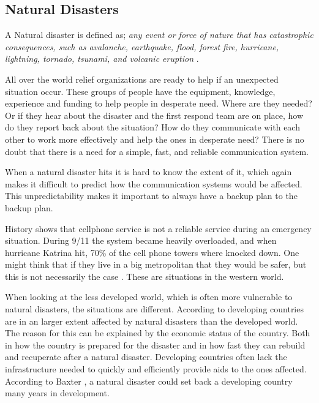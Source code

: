 \subsection{Natural Disasters}
A Natural disaster is defined as; \textit{any event or force of nature that has catastrophic consequences, such as avalanche, earthquake, flood, forest fire, hurricane, lightning, tornado, tsunami, and volcanic eruption} \cite{naturalDisaster}.

All over the world relief organizations are ready to help if an unexpected situation occur. These groups of people have the equipment, knowledge, experience and funding to help people in desperate need. Where are they needed? Or if they hear about the disaster and the first respond team are on place, how do they report back about the situation? How do they communicate with each other to work more effectively and help the ones in desperate need? There is no doubt that there is a need for a simple, fast, and reliable communication system.

When a natural disaster hits it is hard to know the extent of it, which  again makes it difficult to predict how the communication systems would be affected. This unpredictability makes it important to always have a backup plan to the backup plan. 

History shows that cellphone service is not a reliable service during an emergency situation. During 9/11 the system became heavily overloaded, and when hurricane Katrina hit, 70\% of the cell phone towers where knocked down. One might think that if they live in a big metropolitan that they would be safer, but this is not necessarily the case \cite{disasterComm}. These are situations in the western world. 

When looking at the less developed world, which is often more vulnerable to natural disasters, the situations are different. According to \cite{DevelopingWorld, 360} developing countries are in an larger extent affected by natural disasters than the developed world. The reason for this can be explained by the economic status of the country. Both in how the country is prepared for the disaster and in how fast they can rebuild and recuperate after a natural disaster. Developing countries often lack the infrastructure needed to quickly and efficiently provide aids to the ones affected. According to Baxter \cite{360}, a natural disaster could set back a developing country many years in development.  

